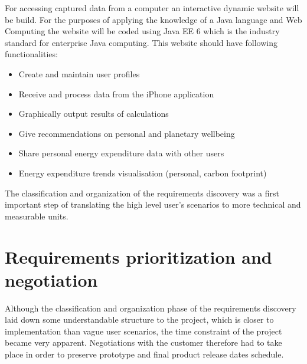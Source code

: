 \documentclass[12pt, a4paper]{report}   %
\begin{document}
\begin{enumerate}
For accessing captured data from a computer an interactive dynamic website will be build. For the purposes of applying the knowledge of a Java language and Web Computing the website will be coded using Java EE 6 which is the industry standard for enterprise Java computing. This website should have following functionalities:
\begin{itemize}
\item Create and maintain user profiles
\item Receive and process data from the iPhone application
\item Graphically output results of calculations
\item Give recommendations on personal and planetary wellbeing
\item Share personal energy expenditure data with other users
\item Energy expenditure trends visualisation (personal, carbon footprint)
\end{itemize}
The classification and organization of the requirements discovery was a first important step of translating the high level user's scenarios to more technical and measurable units.

\section{Requirements prioritization and \\ negotiation}
Although the classification and organization phase of the requirements discovery laid down some understandable structure to the project, which is closer to implementation than vague user scenarios, the time constraint of the project became very apparent. Negotiations with the customer therefore had to take place in order to preserve prototype and final product release dates schedule.


\end{enumerate}
\end{document}
